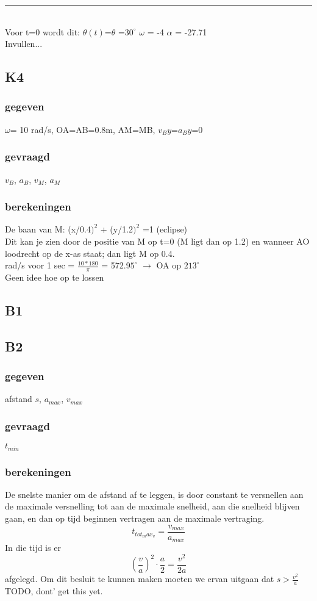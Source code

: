 \documentclass[10pt,a4paper]{article}
\newcommand{\HRule}{\rule{\linewidth}{0.5mm}}
\begin{document}
\HRule \\
Voor t=0 wordt dit: $\theta(t)$=$\theta$ =$30^\circ$\hspace{1cm} $\omega$ = -4\hspace{1cm} $\alpha$ = -27.71\\
Invullen...
\subsection{K4}
\subsubsection*{gegeven}
$\omega$= 10 rad/s, OA=AB=0.8m, AM=MB, $v_By$=$a_By$=0
\subsubsection*{gevraagd}
$v_B$, $a_B$, $v_M$, $a_M$
\subsubsection*{berekeningen}
De baan van M: (x/0.4$)^2$ + (y/1.2$)^2$ =1 (eclipse)\\
Dit kan je zien door de positie van M op t=0 (M ligt dan op 1.2) en wanneer AO loodrecht op de x-as staat; dan ligt M op 0.4.\\

 rad/s voor 1 sec = $\frac{10*180}{\pi}$  = 572.9$5^\circ$ $\rightarrow$ OA op $213^\circ$\\

Geen idee hoe op te lossen
\subsection{B1}

\subsection{B2}
\subsubsection*{gegeven}
afstand $s$, $a_{max}$, $v_{max}$
\subsubsection*{gevraagd}
$t_{min}$
\subsubsection*{berekeningen}
De snelste manier om de afstand af te leggen, is door constant te versnellen aan de maximale versnelling tot aan de maximale snelheid, aan die snelheid blijven gaan, en dan op tijd beginnen vertragen aan de maximale vertraging.
\[
t_{tot_max_v} = \frac{v_{max}}{a_{max}}
\]
In die tijd is er
\[
\left(\frac{v}{a}\right)^{2}\cdot\frac{a}{2} = \frac{v^{2}}{2a}
\]
afgelegd. Om dit besluit te kunnen maken moeten we ervan uitgaan dat $s > \frac{v^{2}}{a}$
TODO, dont' get this yet.
\end{document}
